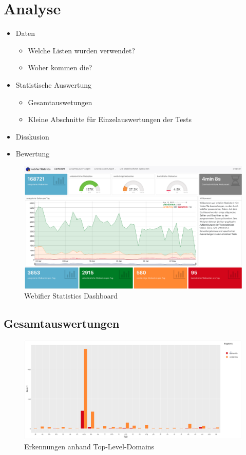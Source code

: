 \chapter{Analyse}

\begin{itemize}
  \item Daten
  \begin{itemize}
    \item Welche Listen wurden verwendet?
    \item Woher kommen die?
  \end{itemize}
  \item Statistische Auswertung
  \begin{itemize}
    \item Gesamtauswetungen
    \item Kleine Abschnitte für Einzelauswertungen der Tests
  \end{itemize}
  \item Disskusion
  \item Bewertung
\end{itemize}


\begin{figure}[H]
  \centering
  \includegraphics[width=15cm]{images/stats/dashboard}
  \caption{Webifier Statistics Dashboard}
  \label{fig:dashboard}
\end{figure}
\section{Gesamtauswertungen}
\begin{figure}[H]
  \centering
  \includegraphics[width=15cm]{images/stats/tlderkennungen}
  \caption{Erkennungen anhand Top-Level-Domains}
  \label{fig:tlderkennungen}
\end{figure}


